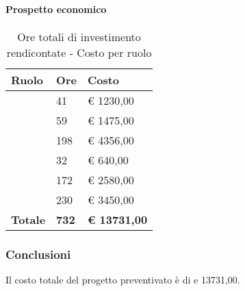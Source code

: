 			\paragraph{Prospetto economico} %
			\label{par:prospetto_economico}
				\begin{table}[!h]
					\begin{center}
						\begin{tabularx}{0.65\textwidth}{|l|l|X|}
							\hline
							\textbf{Ruolo} & \textbf{Ore} & \textbf{Costo} \\
							\hline
							\roleProjectManager & 41 & \euro{} 1230,00 \\
							\hline
							\roleAnalyst & 59 & \euro{} 1475,00 \\
							\hline
							\roleDesigner & 198 & \euro{} 4356,00 \\
							\hline
							\roleAdministrator & 32 & \euro{} 640,00 \\
							\hline
							\roleProgrammer & 172 & \euro{} 2580,00 \\
							\hline
							\roleVerifier & 230 & \euro{} 3450,00 \\
							\hline
							\textbf{Totale} & \textbf{732} & \textbf{\euro{} 13731,00} \\
							\hline
						\end{tabularx}
					\end{center}
				\caption{Ore totali di investimento rendicontate - Costo per ruolo}
				\end{table}
			
		
		\subsubsection{Conclusioni} %
		\label{ssub:conclusioni}
		Il costo totale del progetto preventivato è di e 13731,00.
		
	
